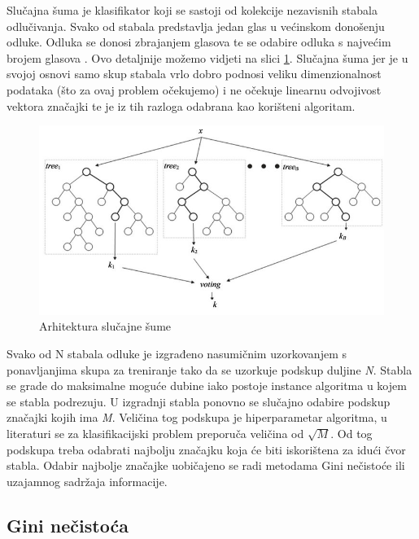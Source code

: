 Slučajna šuma \cite{breiman} je klasifikator koji se sastoji od kolekcije nezavisnih stabala odlučivanja. Svako od stabala predstavlja jedan glas u većinskom donošenju odluke. Odluka se donosi zbrajanjem glasova te se odabire odluka s najvećim brojem glasova \cite{rfdef}. Ovo detaljnije možemo vidjeti na slici \ref{fig:rf}. Slučajna šuma jer je u svojoj osnovi samo skup stabala vrlo dobro podnosi veliku dimenzionalnost podataka (što za ovaj problem očekujemo) i ne očekuje linearnu odvojivost vektora značajki te je iz tih razloga odabrana kao korišteni algoritam.  \\

\begin{figure}[htb]
	\centering
	\includegraphics{fig/random-forest-overview.jpg}
	\caption{Arhitektura slučajne šume \cite{fig-rf}}
	\label{fig:rf}
\end{figure}

	
	Svako od N stabala odluke je izgrađeno nasumičnim uzorkovanjem s ponavljanjima skupa za treniranje tako da se uzorkuje podskup duljine \textit{N}. Stabla se grade do maksimalne moguće dubine iako postoje instance algoritma u kojem se stabla podrezuju. U izgradnji stabla ponovno se slučajno odabire podskup značajki kojih ima \textit{M}. Veličina tog podskupa je hiperparametar algoritma, u literaturi \cite{statisticallearning} se za klasifikacijski problem preporuča veličina od $\sqrt{M}$. Od tog podskupa treba odabrati najbolju značajku koja će biti iskorištena za idući čvor stabla. Odabir najbolje značajke uobičajeno se radi metodama Gini nečistoće ili uzajamnog sadržaja informacije.
	
\subsection{Gini nečistoća}

